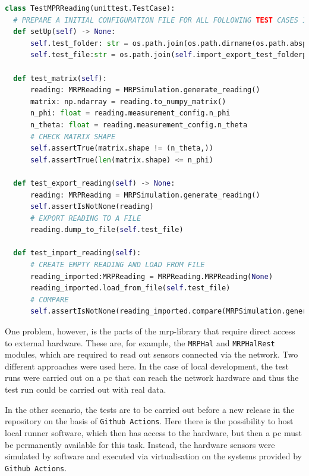 \begin{lstlisting}[language=Python, caption={Example pytest class for testing MRPReading module functions}, label=lst:pytest_example_code]
class TestMPRReading(unittest.TestCase):
  # PREPARE A INITIAL CONFIGURATION FILE FOR ALL FOLLOWING TEST CASES IN THIS FILE
  def setUp(self) -> None:
      self.test_folder: str = os.path.join(os.path.dirname(os.path.abspath(__file__)), "tmp")
      self.test_file:str = os.path.join(self.import_export_test_folderpath, "tmp")

  def test_matrix(self):
      reading: MRPReading = MRPSimulation.generate_reading()
      matrix: np.ndarray = reading.to_numpy_matrix()
      n_phi: float = reading.measurement_config.n_phi
      n_theta: float = reading.measurement_config.n_theta
      # CHECK MATRIX SHAPE
      self.assertTrue(matrix.shape != (n_theta,))
      self.assertTrue(len(matrix.shape) <= n_phi)

  def test_export_reading(self) -> None:
      reading: MRPReading = MRPSimulation.generate_reading()
      self.assertIsNotNone(reading)
      # EXPORT READING TO A FILE
      reading.dump_to_file(self.test_file)

  def test_import_reading(self):
      # CREATE EMPTY READING AND LOAD FROM FILE
      reading_imported:MRPReading = MRPReading.MRPReading(None)
      reading_imported.load_from_file(self.test_file)
      # COMPARE
      self.assertIsNotNone(reading_imported.compare(MRPSimulation.generate_reading()))
\end{lstlisting}

One problem, however, is the parts of the \gls{mrp}-library that require
direct access to external hardware. These are, for example, the
\passthrough{\lstinline!MRPHal!} and
\passthrough{\lstinline!MRPHalRest!} modules, which are required to read
out sensors connected via the network. Two different approaches were
used here. In the case of local development, the test runs were carried
out on a \gls{pc} that can reach the network hardware and thus the test
run could be carried out with real data.

In the other scenario, the tests are to be carried out before a new
release in the repository on the basis of
\passthrough{\lstinline!Github Actions!}\cite{GithubActions}. Here
there is the possibility to host local runner software, which then has
access to the hardware, but then a \gls{pc} must be permanently
available for this task. Instead, the hardware sensors were simulated by
software and executed via virtualisation on the systems provided by
\passthrough{\lstinline!Github Actions!}\cite{GithubActions}.

